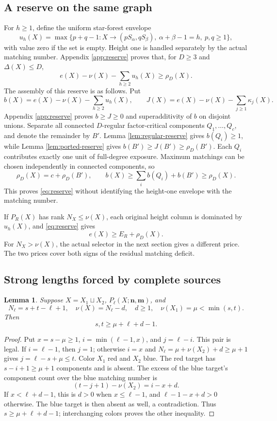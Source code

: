 \documentclass[11pt,a4paper]{article}
\newcommand{\nn}{\mathbf n}\newcommand{\mm}{\mathbf m}
\newtheorem{lemma}[theorem]{Lemma}
\theoremstyle{definition}
\begin{document}
\subsection{A reserve on the same graph}
For $h\ge1$, define the uniform star-forest envelope
\[
u_h(X)=\max\{p+q-1:X\to(pS_\alpha,qS_\beta),\
\alpha+\beta-1=h,\ p,q\ge1\},
\]
with value zero if the set is empty. Height one is handled separately by the actual matching number. Appendix \ref{app:reserve} proves that, for $D\ge3$ and $\Delta(X)\le D$,
\begin{equation}\label{eq:reserve}
e(X)-\nu(X)-\sum_{h\ge2}u_h(X)\ge\rho_D(X).
\end{equation}
The assembly of this reserve is as follows. Put
\[
b(X)=e(X)-\nu(X)-\sum_{h\ge2}u_h(X),\qquad
J(X)=e(X)-\nu(X)-\sum_{j\ge1}\kappa_j(X).
\]
Appendix \ref{app:reserve} proves $b\ge J\ge0$ and superadditivity of $b$ on disjoint unions.
Separate all connected $D$-regular factor-critical components $Q_1,\ldots,Q_c$, and denote the remainder by $B'$.
Lemma \ref{lem:regular-reserve} gives $b(Q_i)\ge1$, while Lemma \ref{lem:ported-reserve} gives
$b(B')\ge J(B')\ge\rho_D(B')$. Each $Q_i$ contributes exactly one unit of full-degree exposure.
Maximum matchings can be chosen independently in connected components, so
\[
 \rho_D(X)=c+\rho_D(B'),\qquad
 b(X)\ge\sum_i b(Q_i)+b(B')\ge\rho_D(X).
\]
This proves \eqref{eq:reserve} without identifying the height-one envelope with the matching number.

If $P_R(X)$ has rank $N_X\le\nu(X)$, each original height column is dominated by $u_h(X)$, and \eqref{eq:reserve} gives
\begin{equation}\label{eq:rich}
e(X)\ge E_R+\rho_D(X).
\end{equation}
For $N_X>\nu(X)$, the actual selector in the next section gives a different price. The two prices cover both signs of the residual matching deficit.

\subsection{Strong lengths forced by complete sources}
\begin{lemma}\label{lem:length}
Suppose $X=X_1\sqcup X_2$, $P_\ell(X;\nn,\mm)$, and
\[
N_\ell=s+t-\ell+1,\quad \nu(X)=N_\ell-d,\quad d\ge1,
\quad \nu(X_1)=\mu<\min(s,t).
\]
Then
\begin{equation}\label{eq:stronglength-general}
s,t\ge\mu+\ell+d-1.
\end{equation}
\end{lemma}
\begin{proof}
Put $x=s-\mu\ge1$, $i=\min(\ell-1,x)$, and $j=\ell-i$. This pair is legal. If $i=\ell-1$, then $j=1$; otherwise $i=x$ and $N_\ell=\mu+\nu(X_2)+d\ge\mu+1$ gives $j=\ell-s+\mu\le t$. Color $X_1$ red and $X_2$ blue. The red target has $s-i+1\ge\mu+1$ components and is absent. The excess of the blue target's component count over the blue matching number is
\[
(t-j+1)-\nu(X_2)=i-x+d.
\]
If $x<\ell+d-1$, this is $d>0$ when $x\le\ell-1$, and $\ell-1-x+d>0$ otherwise. The blue target is then absent as well, a contradiction. Thus $s\ge\mu+\ell+d-1$; interchanging colors proves the other inequality.
\end{proof}
\end{document}
